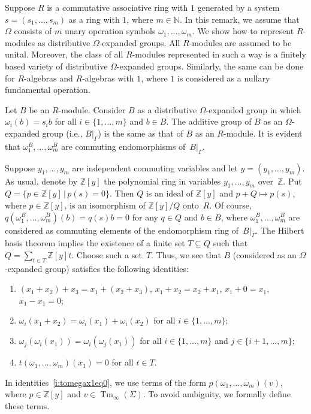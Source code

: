 \documentclass{jgcc}
\DeclareMathOperator{\Tm}{Tm}
\newcommand{\st}{\,|\,}
\newcommand{\Add}[1]{#1|_\Gamma}
\newcommand{\N}{\mathbb N}
\newcommand{\Z}{\mathbb Z}
\begin{document}
\begin{rem}
\label{r:Rmodulesrepr}
Suppose $R$ is a commutative associative ring with $1$
generated by a system $s=(s_1,\dots,s_m)$ as a ring with
$1$, where $m\in\N$. In this remark, we assume that $\Omega$
consists of $m$ unary operation symbols
$\omega_1,\dots,\omega_m$. We show how to represent
$R$-modules as distributive $\Omega$-expanded groups. All
$R$-modules are assumed to be unital. Moreover, the class of
all $R$-modules represented in such a way is a finitely
based variety of distributive $\Omega$-expanded groups.
Similarly, the same can be done for $R$-algebras and
$R$-algebras with $1$, where $1$ is considered as a nullary
fundamental operation.

Let $B$ be an $R$-module. Consider $B$ as a distributive
$\Omega$-expanded group in which $\omega_i(b)=s_ib$ for all
$i\in\{1,\dots,m\}$ and $b\in B$. The additive group of $B$
as an $\Omega$-expanded group (i.e., $\Add B$) is the same
as that of $B$ as an $R$-module. It is evident that
$\omega_1^B,\dots,\omega_m^B$ are commuting endomorphisms
of~$\Add B$.

Suppose $y_1,\dots,y_m$ are independent commuting variables
and let $y=(y_1,\dots,y_m)$. As usual, denote by $\Z[y]$ the
polynomial ring in variables $y_1,\dots,y_m$ over~$\Z$. Put
$Q=\{p\in\Z[y]\st p(s)=0\}$. Then $Q$ is an ideal of $\Z[y]$
and $p+Q\mapsto p(s)$, where $p\in\Z[y]$, is an isomorphism
of $\Z[y]/Q$ onto~$R$. Of course,
$q(\omega_1^B,\dots,\omega_m^B)(b)=q(s)b=0$ for any $q\in Q$
and $b\in B$, where $\omega_1^B,\dots,\omega_m^B$ are
considered as commuting elements of the endomorphism ring
of~$\Add B$. The Hilbert basis theorem implies the existence
of a finite set $T\subseteq Q$ such that $Q=\sum_{t\in
T}\Z[y]t$. Choose such a set~$T$. Thus, we see that $B$
(considered as an $\Omega$-expanded group) satisfies the
following identities:
\begin{enumerate}[label=(\roman*)]
\item\label{i:abelgroup} $(x_1+x_2)+x_3=x_1+(x_2+x_3)$,
$x_1+x_2=x_2+x_1$, $x_1+0=x_1$, $x_1-x_1=0$;

\item $\omega_i(x_1+x_2)=\omega_i(x_1)+\omega_i(x_2)$ for
all $i\in\{1,\dots,m\}$;

\item $\omega_j(\omega_i(x_1))=\omega_i(\omega_j(x_1))$ for
all $i\in\{1,\dots,m\}$ and $j\in\{i+1,\dots,m\}$;

\item\label{i:tomegax1eq0}
$t(\omega_1,\dots,\omega_m)(x_1)=0$ for all $t\in T$.
\end{enumerate}
In identities~\ref{i:tomegax1eq0}, we use terms of the form
$p(\omega_1,\dots,\omega_m)(v)$, where $p\in\Z[y]$ and
$v\in\Tm_\infty(\Sigma)$. To avoid ambiguity, we formally
define these terms.


\end{rem}
\end{document}
